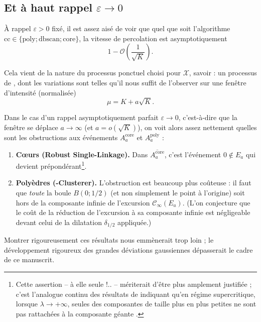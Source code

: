 \subsection{Et à haut rappel $\varepsilon \to 0$}

À rappel $\varepsilon > 0$ fixé, il est assez aisé de voir \cite{BibiMenton} que quel que soit l'algorithme $\mathrm{cc} \in \bigl\{ \mathrm{poly} ; \mathrm{dbscan} ; \mathrm{core} \bigr\}$, la vitesse de percolation est asymptotiquement
\[
1 - \mathcal O\left(\frac{1}{\sqrt K}\right).
\]

Cela vient de la nature du processus ponctuel choisi pour $\mathcal X$, savoir : un processus de , dont les variations sont telles qu'il nous suffit de l'observer sur une fenêtre d'intensité (normalisée) 
\[
\mu = K + a \sqrt K.
\]


Dans le cas d'un rappel asymptotiquement parfait $\varepsilon \to 0$, c'est-à-dire que la fenêtre se déplace $a \to \infty$ (et $a = o(\sqrt K)$), on voit alors assez nettement quelles sont les obstructions aux événements $A^{\mathrm{core}}_a$ et $A^{\mathrm{poly}}_a$ :
\begin{enumerate}
    \item \textbf{C\oe urs (Robust Single-Linkage).} Dans $\overline{A^{\mathrm{core}}_a}$, c'est l'événement $0 \notin E_a$ qui devient prépondérant\footnote{Cette assertion -- à elle seule !.. -- mériterait d'être plus amplement justifiée ; c'est l'analogue continu des résultats de  indiquant qu'en régime supercritique, lorsque $\lambda \to +\infty$, seules des composantes de taille plus en plus petites ne sont pas rattachées à la composante géante \cite{penrose2003, Penrose2025, PenroseKclusters}.}.
    \item \textbf{Polyèdres (\HGP-Clusterer).} L'obstruction est beaucoup plus coûteuse : il faut que \emph{toute} la boule $B(0 ; 1/2)$ (et non simplement le point à l'origine) soit hors de la composante infinie de l'excursion $\mathcal C_\infty \left( E_a\right)$. (L'on conjecture que le coût de la réduction de l'excursion à sa composante infinie est négligeable devant celui de la dilatation $\delta_{1/2}$ appliquée.)
\end{enumerate}

Montrer rigoureusement ces résultats nous emmènerait trop loin ; le développement rigoureux des grandes déviations gaussiennes dépasserait le cadre de ce manuscrit. %


